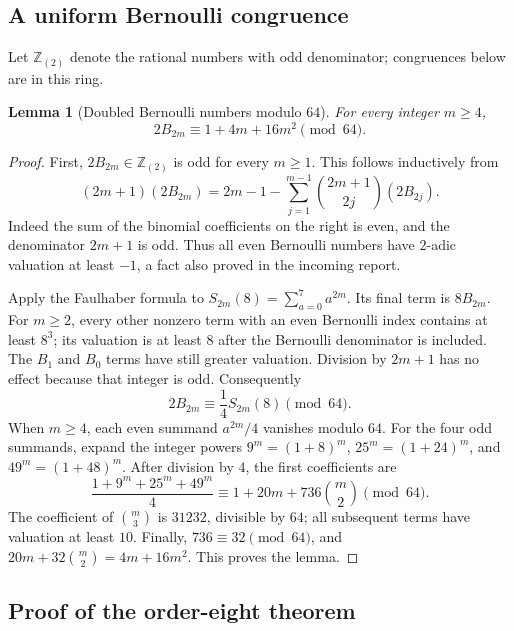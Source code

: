 \documentclass[11pt,letterpaper]{article}
\newtheorem{lemma}[theorem]{Lemma}
\theoremstyle{definition}
\theoremstyle{remark}
\numberwithin{equation}{section}
\begin{document}
\subsection{A uniform Bernoulli congruence}

Let $\mathbb Z_{(2)}$ denote the rational numbers with odd
denominator; congruences below are in this ring.

\begin{lemma}[Doubled Bernoulli numbers modulo $64$]
\label{rank8:bernoulli}
For every integer $m\ge4$,
\begin{equation}\label{rank8:bernoulli64}
 \boxed{2B_{2m}\equiv1+4m+16m^2\pmod {64}.}
\end{equation}
\end{lemma}

\begin{proof}
First, $2B_{2m}\in\mathbb Z_{(2)}$ is odd for every $m\ge1$.
This follows inductively from
\[
 (2m+1)(2B_{2m})
 =2m-1-\sum_{j=1}^{m-1}\binom{2m+1}{2j}(2B_{2j}).
\]
Indeed the sum of the binomial coefficients on the right is even,
and the denominator $2m+1$ is odd.  Thus all even Bernoulli
numbers have $2$-adic valuation at least $-1$, a fact also proved
in the incoming report.

Apply the Faulhaber formula to
$S_{2m}(8)=\sum_{a=0}^{7}a^{2m}$.  Its final term is $8B_{2m}$.
For $m\ge2$, every other nonzero term with an even Bernoulli index
contains at least $8^3$; its valuation is at least $8$ after the
Bernoulli denominator is included.  The $B_1$ and $B_0$ terms have
still greater valuation.  Division by $2m+1$ has no effect because
that integer is odd.  Consequently
\[
 2B_{2m}\equiv\frac14S_{2m}(8)\pmod {64}.
\]
When $m\ge4$, each even summand $a^{2m}/4$ vanishes modulo $64$.
For the four odd summands, expand the integer powers
$9^m=(1+8)^m$, $25^m=(1+24)^m$, and $49^m=(1+48)^m$.
After division by $4$, the first coefficients are
\[
 \frac{1+9^m+25^m+49^m}{4}
 \equiv1+20m+736\binom m2\pmod {64}.
\]
The coefficient of $\binom m3$ is $31232$, divisible by $64$;
all subsequent terms have valuation at least $10$.  Finally,
$736\equiv32\pmod {64}$, and
$20m+32\binom m2=4m+16m^2$.  This proves the lemma.
\end{proof}

\subsection{Proof of the order-eight theorem}
\end{document}
